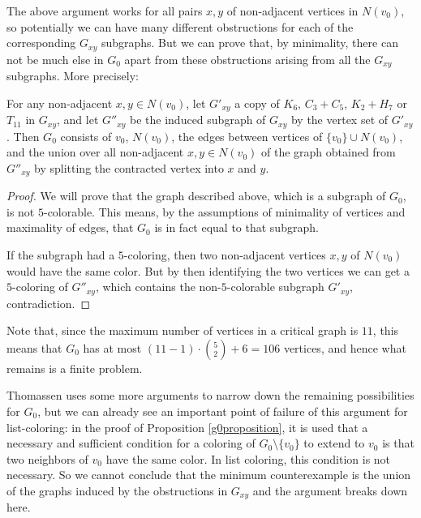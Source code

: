 The above argument works for all pairs $x, y$ of non-adjacent vertices in $N(v_0)$, so potentially 
we can have many different obstructions for each of the corresponding $G_{xy}$ subgraphs. 
But we can prove that, by minimality, there can not be much else in $G_0$ apart from these
obstructions arising from all the $G_{xy}$ subgraphs. More precisely:  

\begin{proposition}
	\label{g0proposition}
	For any non-adjacent $x, y \in N(v_0)$, let $G'_{xy}$ a copy of 
	$K_6$, $C_3 + C_5$, $K_2 + H_7$ or $T_{11}$ in $G_{xy}$, and let $G''_{xy}$ be the induced
	subgraph of $G_{xy}$ by the vertex set of $G'_{xy}$. Then $G_0$ consists of $v_0$, $N(v_0)$, 
	the edges between vertices of $\{v_0\} \cup N(v_0)$, and the union over all non-adjacent 
	$x, y \in N(v_0)$ of the graph obtained from $G''_{xy}$ by splitting the contracted vertex
	into $x$ and $y$.  
\end{proposition}

\begin{proof}
We will prove that the graph described above, which is a subgraph of $G_0$, is not $5$-colorable. 
This means, by the assumptions of minimality of vertices and maximality of edges, that $G_0$ is
in fact equal to that subgraph. 

If the subgraph had a $5$-coloring, then two non-adjacent vertices $x, y$ of $N(v_0)$ would 
have the same color. But by then identifying the two vertices we can get a $5$-coloring 
of $G''_{xy}$, which contains the non-$5$-colorable subgraph $G'_{xy}$, contradiction.

\end{proof}

Note that, since the maximum number of vertices in a critical graph is $11$, this means that
$G_0$ has at most $(11 - 1) \cdot \binom{5}{2} + 6 = 106$ vertices, and hence what remains
is a finite problem.

Thomassen uses some more arguments to narrow down the remaining possibilities for $G_0$, but
we can already see an important point of failure of this argument for list-coloring: in the 
proof of Proposition \ref{g0proposition}, it is used that a necessary and sufficient condition for a coloring
of $G_0 \setminus \{v_0\}$ to extend to $v_0$ is that two neighbors of $v_0$ have the same color.
In list coloring, this condition is not necessary. So we cannot conclude that the minimum 
counterexample is the union of the graphs induced by the obstructions in $G_{xy}$ and the 
argument breaks down here. 












